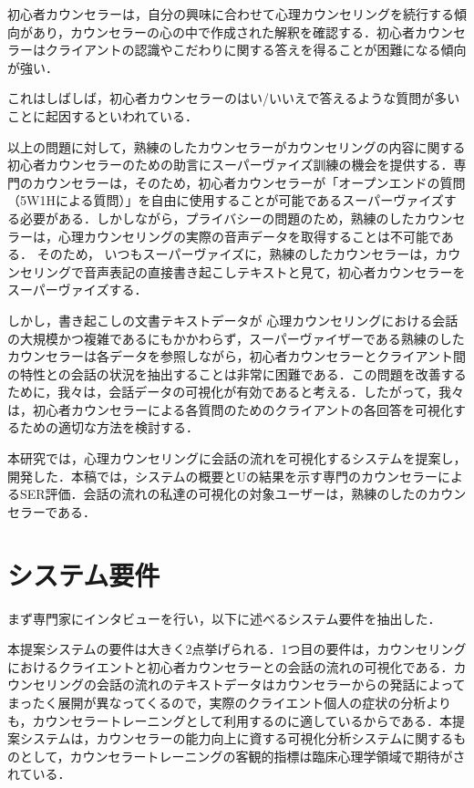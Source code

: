 \documentclass[shuuron]{kuee}
\begin{document}
  初心者カウンセラーは，自分の興味に合わせて心理カウンセリングを続行する傾向があり，カウンセラーの心の中で作成された解釈を確認する．初心者カウンセラーはクライアントの認識やこだわりに関する答えを得ることが困難になる傾向が強い．

これはしばしば，初心者カウンセラーのはい/いいえで答えるような質問が多いことに起因するといわれている．

 以上の問題に対して，熟練のしたカウンセラーがカウンセリングの内容に関する初心者カウンセラーのための助言にスーパーヴァイズ訓練の機会を提供する．専門のカウンセラーは，そのため，初心者カウンセラーが「オープンエンドの質問（5W1Hによる質問）」を自由に使用することが可能であるスーパーヴァイズする必要がある．しかしながら，プライバシーの問題のため，熟練のしたカウンセラーは，心理カウンセリングの実際の音声データを取得することは不可能である． そのため， いつもスーパーヴァイズに，熟練のしたカウンセラーは，カウンセリングで音声表記の直接書き起こしテキストと見て，初心者カウンセラーをスーパーヴァイズする．

  しかし，書き起こしの文書テキストデータが 心理カウンセリングにおける会話の大規模かつ複雑であるにもかかわらず，スーパーヴァイザーである熟練のしたカウンセラーは各データを参照しながら，初心者カウンセラーとクライアント間の特性との会話の状況を抽出することは非常に困難である．この問題を改善するために，我々は，会話データの可視化が有効であると考える．したがって，我々は，初心者カウンセラーによる各質問のためのクライアントの各回答を可視化するための適切な方法を検討する．

  本研究では，心理カウンセリングに会話の流れを可視化するシステムを提案し，開発した．本稿では，システムの概要とUの結果を示す専門のカウンセラーによるSER評価．会話の流れの私達の可視化の対象ユーザーは，熟練のしたのカウンセラーである．




\section{システム要件}




まず専門家にインタビューを行い，以下に述べるシステム要件を抽出した．




本提案システムの要件は大きく2点挙げられる．1つ目の要件は，カウンセリングにおけるクライエントと初心者カウンセラーとの会話の流れの可視化である．カウンセリングの会話の流れのテキストデータはカウンセラーからの発話によってまったく展開が異なってくるので，実際のクライエント個人の症状の分析よりも，カウンセラートレーニングとして利用するのに適しているからである．本提案システムは，カウンセラーの能力向上に資する可視化分析システムに関するものとして，カウンセラートレーニングの客観的指標は臨床心理学領域で期待がされている．
\end{document}
